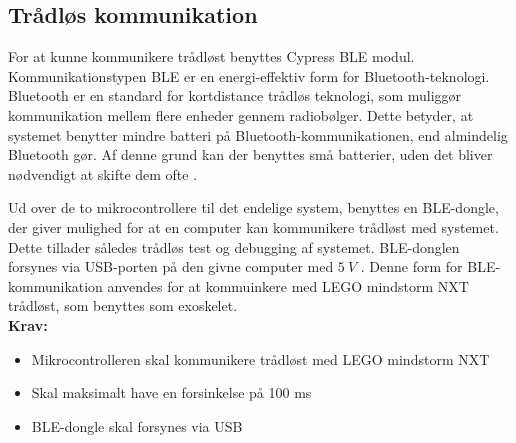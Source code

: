 \subsection{Trådløs kommunikation}
For at kunne kommunikere trådløst benyttes Cypress BLE modul. Kommunikationstypen BLE \citep{cypressguide2014} er en energi-effektiv form for Bluetooth-teknologi. Bluetooth er en standard for kortdistance trådløs teknologi, som muliggør kommunikation mellem flere enheder gennem radiobølger. Dette betyder, at systemet benytter mindre batteri på Bluetooth-kommunikationen, end almindelig Bluetooth gør. Af denne grund kan der benyttes små batterier, uden det bliver nødvendigt at skifte dem ofte \citep{gupta2013}. 
\\
\noindent

Ud over de to mikrocontrollere til det endelige system, benyttes en BLE-dongle, der giver mulighed for at en computer kan kommunikere trådløst med systemet. Dette tillader således trådløs test og debugging af systemet. BLE-donglen forsynes via USB-porten på den givne computer med $5~V$ \citep{cypressguide2014}. Denne form for BLE-kommunikation anvendes for at kommuinkere med LEGO mindstorm NXT trådløst, som benyttes som exoskelet. 
\\

\textbf{Krav:}
\begin{itemize}
\item Mikrocontrolleren skal kommunikere trådløst med LEGO mindstorm NXT
\item Skal maksimalt have en forsinkelse på 100 ms 
\item BLE-dongle skal forsynes via USB
\end{itemize}